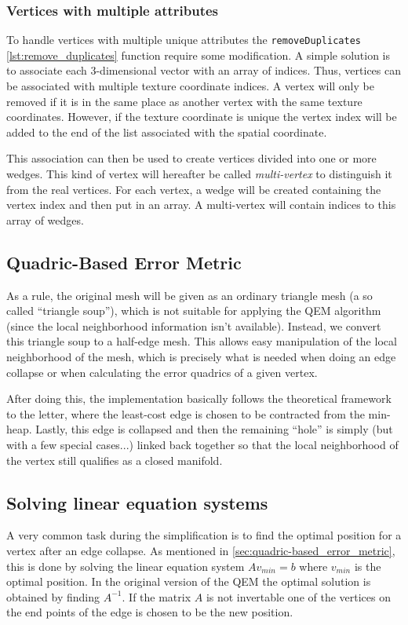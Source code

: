 \begin{subs}
\subsubsection{Vertices with multiple attributes}
To handle vertices with multiple unique attributes the \texttt{removeDuplicates} \cref{lst:remove_duplicates} function require some modification. A simple solution is to associate each 3-dimensional vector with an array of indices. Thus, vertices can be associated with multiple texture coordinate indices. A vertex will only be removed if it is in the same place as another vertex with the same texture coordinates. However, if the texture coordinate is unique the vertex index will be added to the end of the list associated with the spatial coordinate.

This association can then be used to create vertices divided into one or more wedges. This kind of vertex will hereafter be called \emph{multi-vertex} to distinguish it from the real vertices. For each vertex, a wedge will be created containing the vertex index and then put in an array. A multi-vertex will contain indices to this array of wedges. 
\end{subs}

\subsection{Quadric-Based Error Metric} \label{sec:quadric-based_error_metric2}
As a rule, the original mesh will be given as an ordinary triangle mesh (a so called ``triangle soup''), which is not suitable for applying the QEM algorithm (since the local neighborhood information isn't available). Instead, we convert this triangle soup to a half-edge mesh. This allows easy manipulation of the local neighborhood of the mesh, which is precisely what is needed when doing an edge collapse or when calculating the error quadrics of a given vertex.

After doing this, the implementation basically follows the theoretical framework to the letter, where the least-cost edge is chosen to be contracted from the min-heap. Lastly, this edge is collapsed and then the remaining ``hole'' is simply (but with a few special cases...) linked back together so that the local neighborhood of the vertex still qualifies as a closed manifold.

\subsection{Solving linear equation systems}
A very common task during the simplification is to find the optimal position for a vertex after an edge collapse. As mentioned in \cref{sec:quadric-based_error_metric}, this is done by solving the linear equation system \(A v_{min} = b\) where \(v_{min}\) is the optimal position. In the original version of the QEM the optimal solution is obtained by finding \(A^{-1}\). If the matrix \(A\) is not invertable one of the vertices on the end points of the edge is chosen to be the new position.

